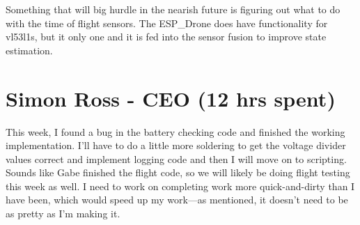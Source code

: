 \documentclass[12pt, titlepage]{article}
\begin{document}
Something that will big hurdle in the nearish future is figuring out what to do with the time of flight sensors. The ESP\_Drone does have functionality for vl53l1s, but it only one and it is fed into the sensor fusion to improve state estimation. 

\section*{Simon Ross - CEO (12 hrs spent)}

This week, I found a bug in the battery checking code and finished the working implementation. I'll have to do a little more soldering to get the voltage divider values correct and implement logging code and then I will move on to scripting. Sounds like Gabe finished the flight code, so we will likely be doing flight testing this week as well. I need to work on completing work more quick-and-dirty than I have been, which would speed up my work---as mentioned, it doesn't need to be as pretty as I'm making it.
\end{document}
